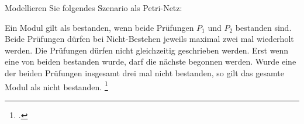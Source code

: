 \documentclass{lehramt-informatik-aufgabe}
\begin{document}

Modellieren Sie folgendes Szenario als Petri-Netz:

\bigskip

\noindent
Ein Modul gilt als bestanden, wenn beide Prüfungen $P_1$ und $P_2$
bestanden sind. Beide Prüfungen dürfen bei Nicht-Bestehen jeweils
maximal zwei mal wiederholt werden. Die Prüfungen dürfen nicht
gleichzeitig geschrieben werden. Erst wenn eine von beiden bestanden
wurde, darf die nächste begonnen werden. Wurde eine der beiden Prüfungen
insgesamt drei mal nicht bestanden, so gilt das gesamte Modul als nicht
bestanden.
\footcite[Seite 2]{sosy:ab:4}
\end{document}
